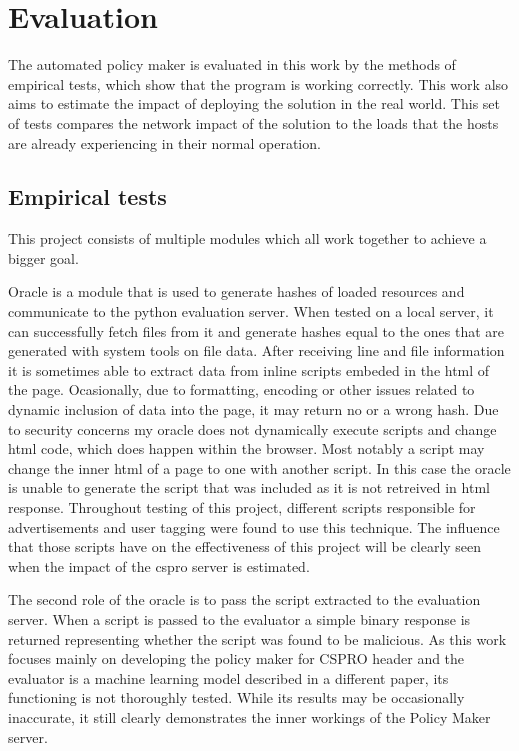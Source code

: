 \chapter{Evaluation}

The automated policy maker is evaluated in this work by the methods of empirical tests, which show that the program is working correctly.
This work also aims to estimate the impact of deploying the solution in the real world.
This set of tests compares the network impact of the solution to the loads that the hosts are already experiencing in their normal operation.

\section{Empirical tests}

This project consists of multiple modules which all work together to achieve a bigger goal.

Oracle is a module that is used to generate hashes of loaded resources and communicate to the python evaluation server.
When tested on a local server, it can successfully fetch files from it and generate hashes equal to the ones that are generated with system tools on file data.
After receiving line and file information it is sometimes able to extract data from inline scripts embeded in the html of the page.
Ocasionally, due to formatting, encoding or other issues related to dynamic inclusion of data into the page, it may return no or a wrong hash.
Due to security concerns my oracle does not dynamically execute scripts and change html code, which does happen within the browser.
Most notably a script may change the inner html of a page to one with another script.
In this case the oracle is unable to generate the script that was included as it is not retreived in html response.
Throughout testing of this project, different scripts responsible for advertisements and user tagging were found to use this technique.
The influence that those scripts have on the effectiveness of this project will be clearly seen when the impact of the cspro server is estimated.

The second role of the oracle is to pass the script extracted to the evaluation server.
When a script is passed to the evaluator a simple binary response is returned representing whether the script was found to be malicious.
As this work focuses mainly on developing the policy maker for CSPRO header and the evaluator is a machine learning model described in a different paper, its functioning is not thoroughly tested.
While its results may be occasionally inaccurate, it still clearly demonstrates the inner workings of the Policy Maker server.

